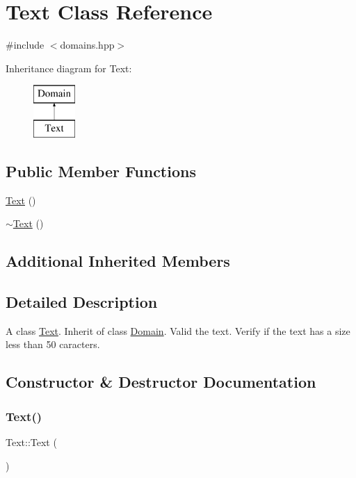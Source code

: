\hypertarget{class_text}{}\section{Text Class Reference}
\label{class_text}


{\ttfamily \#include $<$domains.\+hpp$>$}

Inheritance diagram for Text\+:\begin{figure}[H]
\begin{center}
\leavevmode
\includegraphics[height=2.000000cm]{class_text}
\end{center}
\end{figure}
\subsection*{Public Member Functions}
\begin{DoxyCompactItemize}
\item 
\hyperlink{class_text_ab3e26143fccc52699bcc5149cae852bc}{Text} ()
\item 
\hyperlink{class_text_a2d49e5c280e205125b149f7777ae30c7}{$\sim$\+Text} ()
\end{DoxyCompactItemize}
\subsection*{Additional Inherited Members}


\subsection{Detailed Description}
A class \hyperlink{class_text}{Text}. Inherit of class \hyperlink{class_domain}{Domain}. Valid the text. Verify if the text has a size less than 50 caracters. 

\subsection{Constructor \& Destructor Documentation}
\mbox{\label{class_text_ab3e26143fccc52699bcc5149cae852bc}} 
\subsubsection{\texorpdfstring{Text()}{Text()}}
{\footnotesize\ttfamily Text\+::\+Text (\begin{DoxyParamCaption}{ }\end{DoxyParamCaption})}


